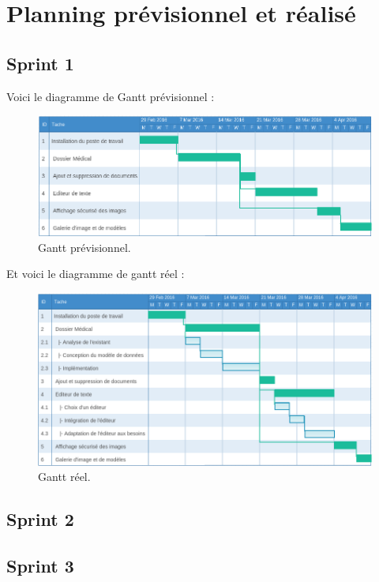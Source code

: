\newpage
\section{Planning prévisionnel et réalisé} %
\subsection{Sprint 1}
Voici le diagramme de Gantt prévisionnel : 

\begin{figure}[H]
  \centering
  \includegraphics[width=17cm]{./img/gantt_prev}
  \caption{\label{fig:mb_va_ast} Gantt prévisionnel.}
\end{figure}

Et voici le diagramme de gantt réel : 

\begin{figure}[H]
  \centering
  \includegraphics[width=17cm]{./img/gantt_reel}
  \caption{\label{fig:mb_va_ast} Gantt réel.}
\end{figure}

\subsection{Sprint 2}

\subsection{Sprint 3}

